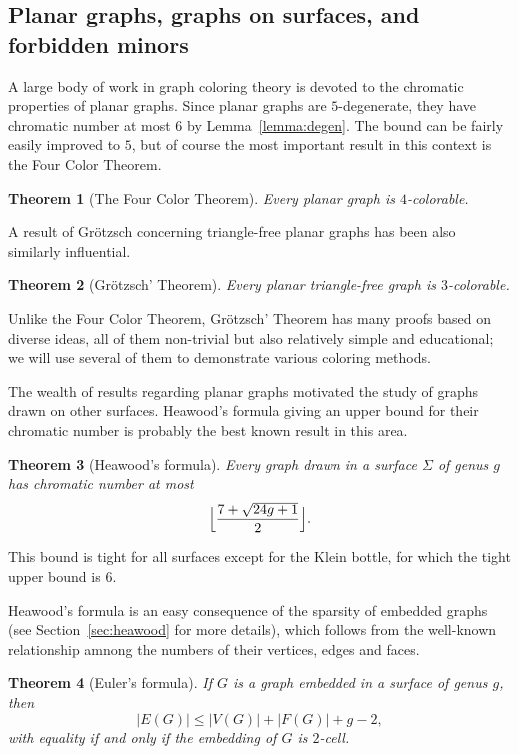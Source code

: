 \documentclass[12pt,twoside,openright,a4paper]{book}
\newtheorem{theorem}{Theorem}[chapter]
\begin{document}
\subsection{Planar graphs, graphs on surfaces, and forbidden minors}

A large body of work in graph coloring theory is devoted to the chromatic properties of planar graphs.
Since planar graphs are $5$-degenerate, they have chromatic number at most $6$ by Lemma~\ref{lemma:degen}.
The bound can be fairly easily improved to $5$, but of course the most important result in this context is
the Four Color Theorem.

\begin{theorem}[The Four Color Theorem]
Every planar graph is $4$-colorable.
\end{theorem}

A result of Gr\"{o}tzsch concerning triangle-free planar graphs has been also similarly influential.
\begin{theorem}[Gr\"{o}tzsch' Theorem]
Every planar triangle-free graph is $3$-colorable.
\end{theorem}
Unlike the Four Color Theorem, Gr\"{o}tzsch' Theorem has many proofs based on diverse ideas, all of them non-trivial but also
relatively simple and educational; we will use several of them to demonstrate various coloring methods.

The wealth of results regarding planar graphs motivated the study of graphs drawn on other surfaces.
Heawood's formula giving an upper bound for their chromatic number is probably the best known result in this area.
\begin{theorem}[Heawood's formula]
Every graph drawn in a surface $\Sigma$ of genus $g$ has chromatic number at most
$$\Bigl\lfloor\frac{7+\sqrt{24g+1}}{2}\Bigr\rfloor.$$
\end{theorem}
This bound is tight for all surfaces except for the Klein bottle, for which the tight upper bound is $6$.

Heawood's formula is an easy consequence of the sparsity of embedded graphs (see Section~\ref{sec:heawood}
for more details), which follows from the well-known relationship amnong the numbers of their vertices, edges and faces.

\begin{theorem}[Euler's formula]\label{thm:eulerfla}
If $G$ is a graph embedded in a surface of genus $g$, then
$$|E(G)|\le |V(G)|+|F(G)|+g-2,$$
with equality if and only if the embedding of $G$ is $2$-cell.
\end{theorem}
\end{document}
